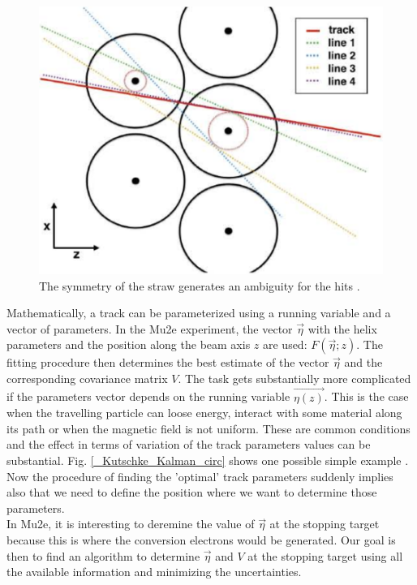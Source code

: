 \documentclass[12pt,a4paper,openright, oneside, titlepage]{book} %
\begin{document}
\begin{figure}[h!]
\centering
\includegraphics[scale=0.5]{giani_PatRec_ambiguity}
\caption{The symmetry of the straw generates an ambiguity for the hits \cite{GianiPatRec:2020}.}
\label{_ambiguity}
\end{figure}

\noindent Mathematically, a track can be parameterized using a running variable and a vector of parameters. 
In the Mu2e experiment, the vector $\vec{\eta}$ with the helix parameters and the position along the beam axis $z$ are used: $F(\vec{\eta};z)$. 
The fitting procedure then determines the best estimate of the vector $\vec{\eta}$ and the corresponding covariance matrix $V$. 
The task gets substantially more complicated if the parameters vector depends on the running variable $\vec{\eta(z)}$. 
This is the case when the travelling particle can loose energy, interact with some material along its path or when the magnetic field is not uniform. 
These are common conditions and the effect in terms of variation of the track parameters values can be substantial.
Fig. \ref{_Kutschke_Kalman_circ} shows one possible simple example \cite{Kutschke}.
Now the procedure of finding the 'optimal' track parameters suddenly implies also that we need to define the position where we want to determine those parameters.\\
In Mu2e, it is interesting to deremine the value of $\vec{\eta}$ at the stopping target because this is where the conversion electrons would be generated. 
Our goal is then to find an algorithm to determine $\vec{\eta}$ and $V$ at the stopping target using all the available information and minimizing the uncertainties.\\
\end{document}
